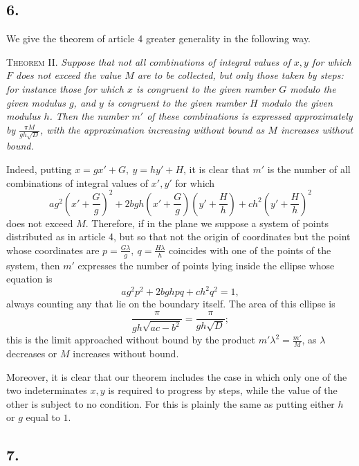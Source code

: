 \documentclass[12pt]{article}
\begin{document}
\subsection*{6.}

We give the theorem of article 4 greater generality in the following way.

\textsc{Theorem II.} \emph{Suppose that not all combinations of integral values of $x,y$ for which $F$ does not exceed the value $M$ are to be collected, but only those taken by steps: for instance those for which $x$ is congruent to the given number $G$ modulo the given modulus $g$, and $y$ is congruent to the given number $H$ modulo the given modulus $h$. Then the number $m'$ of these combinations is expressed approximately by $\frac{\pi M}{gh\sqrt D}$, with the approximation increasing without bound as $M$ increases without bound.}

Indeed, putting $x=gx'+G,\ y=hy'+H$, it is clear that $m'$ is the number of all combinations of integral values of $x',y'$ for which
\[
ag^2\left(x'+\frac{G}{g}\right)^2+2bgh\left(x'+\frac{G}{g}\right)\left(y'+\frac{H}{h}\right)+ch^2\left(y'+\frac{H}{h}\right)^2
\]
does not exceed $M$. Therefore, if in the plane we suppose a system of points distributed as in article 4, but so that not the origin of coordinates but the point whose coordinates are $p=\frac{G\lambda}{g},\ q=\frac{H\lambda}{h}$ coincides with one of the points of the system, then $m'$ expresses the number of points lying inside the ellipse whose equation is
\[
ag^2p^2+2bghpq+ch^2q^2=1,
\]
always counting any that lie on the boundary itself. The area of this ellipse is
\[
\frac{\pi}{gh\sqrt{ac-b^2}}=\frac{\pi}{gh\sqrt D};
\]
this is the limit approached without bound by the product $m'\lambda^2=\frac{m'}{M}$, as $\lambda$ decreases or $M$ increases without bound.

Moreover, it is clear that our theorem includes the case in which only one of the two indeterminates $x,y$ is required to progress by steps, while the value of the other is subject to no condition. For this is plainly the same as putting either $h$ or $g$ equal to $1$.

\subsection*{7.}
\end{document}
